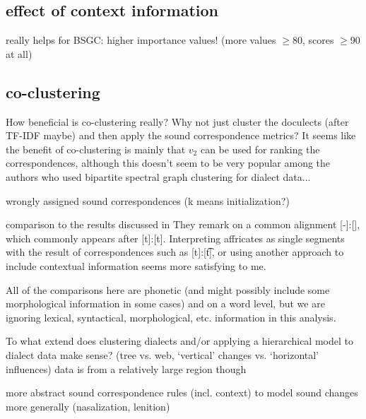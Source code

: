 \documentclass{article}
\begin{document}
\subsection{effect of context information}

really helps for BSGC: higher importance values! (more values $\geq$80, scores $\geq$90 at all)

\subsection{co-clustering}
How beneficial is co-clustering really? Why not just cluster the doculects (after TF-IDF maybe) and then apply the sound correspondence metrics? It seems like the benefit of co-clustering is mainly that $v_2$ can be used for ranking the correspondences, although this doesn't seem to be very popular among the authors who used bipartite spectral graph clustering for dialect data...

wrongly assigned sound correspondences (k means initialization?)

comparison to the results discussed in \citet{wieling2011bipartite}
They remark on a common alignment [-]:[\textesh], which commonly appears after [t]:[t]. Interpreting affricates as single segments with the result of correspondences such as [t]:[\t{t\textesh}], or using another approach to include contextual information seems more satisfying to me.


All of the comparisons here are phonetic (and might possibly include some morphological information in some cases) and on a word level, but we are ignoring lexical, syntactical, morphological, etc. information in this analysis.

To what extend does clustering dialects and/or applying a hierarchical model to dialect data make sense? (tree vs. web, `vertical' changes vs. `horizontal' influences)
data is from a relatively large region though

more abstract sound correspondence rules (incl. context) to model sound changes more generally (nasalization, lenition)



\end{document}
